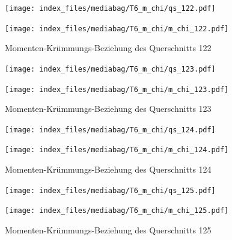 \documentclass[
  11pt,
  letterpaper,
]{scrreprt}
\begin{document}
\begin{figure}[H]

\begin{minipage}{0.50\linewidth}
\texttt{[image: index\_files/mediabag/T6\_m\_chi/qs\_122.pdf]}\end{minipage}%
%
\begin{minipage}{0.50\linewidth}
\texttt{[image: index\_files/mediabag/T6\_m\_chi/m\_chi\_122.pdf]}\end{minipage}%

\caption{\label{fig-mchi_anhang}Momenten-Krümmungs-Beziehung des
Querschnitts 122}

\end{figure}%

\begin{figure}[H]

\begin{minipage}{0.50\linewidth}
\texttt{[image: index\_files/mediabag/T6\_m\_chi/qs\_123.pdf]}\end{minipage}%
%
\begin{minipage}{0.50\linewidth}
\texttt{[image: index\_files/mediabag/T6\_m\_chi/m\_chi\_123.pdf]}\end{minipage}%

\caption{\label{fig-mchi_anhang}Momenten-Krümmungs-Beziehung des
Querschnitts 123}

\end{figure}%

\begin{figure}[H]

\begin{minipage}{0.50\linewidth}
\texttt{[image: index\_files/mediabag/T6\_m\_chi/qs\_124.pdf]}\end{minipage}%
%
\begin{minipage}{0.50\linewidth}
\texttt{[image: index\_files/mediabag/T6\_m\_chi/m\_chi\_124.pdf]}\end{minipage}%

\caption{\label{fig-mchi_anhang}Momenten-Krümmungs-Beziehung des
Querschnitts 124}

\end{figure}%

\begin{figure}[H]

\begin{minipage}{0.50\linewidth}
\texttt{[image: index\_files/mediabag/T6\_m\_chi/qs\_125.pdf]}\end{minipage}%
%
\begin{minipage}{0.50\linewidth}
\texttt{[image: index\_files/mediabag/T6\_m\_chi/m\_chi\_125.pdf]}\end{minipage}%

\caption{\label{fig-mchi_anhang}Momenten-Krümmungs-Beziehung des
Querschnitts 125}

\end{figure}%
\end{document}
